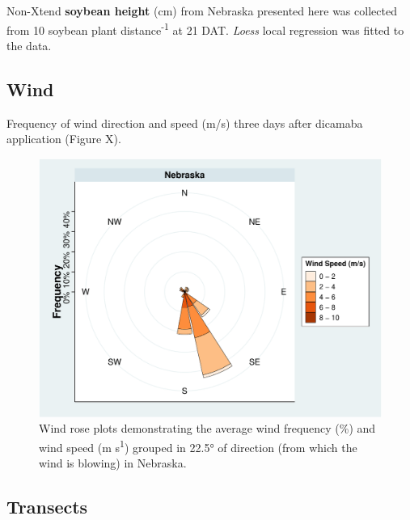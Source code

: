\documentclass[]{article}
\begin{document}
Non-Xtend \textbf{soybean height} (cm) from Nebraska presented here was
collected from 10 soybean plant distance\textsuperscript{-1} at 21 DAT.
\emph{Loess} local regression was fitted to the data.

\pagebreak
\newpage

\pagebreak
\newpage

\subsection{Wind}\label{wind-3}

Frequency of wind direction and speed (m/s) three days after dicamaba
application (Figure X).

\begin{figure}
\centering
\includegraphics{Report_Dicamba_study_files/figure-latex/unnamed-chunk-64-1.pdf}
\caption{Wind rose plots demonstrating the average wind frequency (\%)
and wind speed (m s\textsuperscript{1}) grouped in 22.5° of direction
(from which the wind is blowing) in Nebraska.}
\end{figure}

\pagebreak
\newpage

\subsection{Transects}\label{transects-3}
\end{document}
